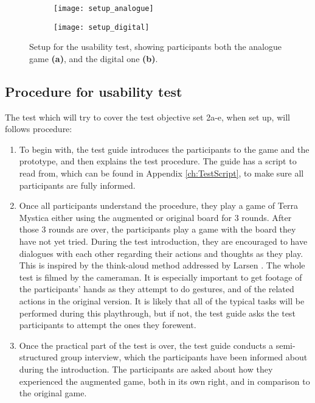 \begin{figure}[!h]
	\centering
	\begin{subfigure}[b]{0.4\textwidth}
	\texttt{[image: setup\_analogue]}
		\caption{\label{Fig:SetupAna}}
	\end{subfigure}
	\begin{subfigure}[b]{0.4\textwidth}
	\texttt{[image: setup\_digital]}
		\caption{\label{Fig:SetupDigi}}
	\end{subfigure}
	\caption{Setup for the usability test, showing participants both the analogue game \textbf{(a)}, and the digital one \textbf{(b)}.\label{Fig:Setup}}
\end{figure}

\subsection{Procedure for usability test}
The test which will try to cover the test objective set 2a-e, when set up, will follows procedure:

\begin{enumerate}
\item To begin with, the test guide introduces the participants to the game and the prototype, and then explains the test procedure. The guide has a script to read from, which can be found in Appendix \ref{ch:TestScript}, to make sure all participants are fully informed.
\item Once all participants understand the procedure, they play a game of Terra Mystica either using the augmented or original board for 3 rounds. After those 3 rounds are over, the participants play a game with the board they have not yet tried. During the test introduction, they are encouraged to have dialogues with each other regarding their actions and thoughts as they play. This is inspired by the think-aloud method addressed by Larsen \citep{TestingLecture}. The whole test is filmed by the cameraman. It is especially important to get footage of the participants' hands as they attempt to do gestures, and of the related actions in the original version. It is likely that all of the typical tasks will be performed during this playthrough, but if not, the test guide asks the test participants to attempt the ones they forewent.
\item Once the practical part of the test is over, the test guide conducts a semi-structured group interview, which the participants have been informed about during the introduction. The participants are asked about how they experienced the augmented game, both in its own right, and in comparison to the original game.
\end{enumerate}


